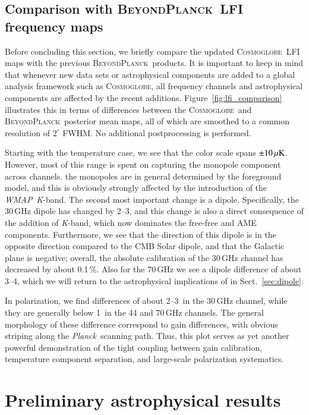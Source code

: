 \documentclass[twocolumn]{../../common/aa}
\def\WMAP{\emph{WMAP}}
\def\Planck{\emph{Planck}}
\newcommand{\BP}{\textsc{BeyondPlanck}}
\newcommand{\bp}{\textsc{BeyondPlanck}}
\newcommand{\cosmoglobe}{\textsc{Cosmoglobe}}
\newcommand{\K}[0]{\textit K}
\begin{document}
\subsection{Comparison with \BP\ LFI frequency maps}
\label{subsec:lfi_comparison}

Before concluding this section, we briefly compare the updated \cosmoglobe\ LFI maps with the previous \bp\ products. It is important to keep in mind that whenever new data sets or astrophysical components are added to a global analysis framework such as \cosmoglobe, all frequency channels and astrophysical components are affected by the recent additions. Figure~\ref{fig:lfi_comparison} illustrates this in terms of differences between the \cosmoglobe\ and \bp\ posterior mean maps, all of which are smoothed to a common resolution of $2^{\circ}$ FWHM. No additional postprocessing is performed.

Starting with the temperature case, we see that the color scale spans
$\pm10\muK$. However, most of this range is spent on capturing the monopole
component across channels. the monopoles are in general determined by the
foreground model, and this is obviously strongly affected by the introduction of
the \WMAP\ \K-band. The second most important change is a dipole. Specifically,
the 30\,GHz dipole has changed by 2--3\muK, and this change is also a direct consequence of the addition of \K-band, which now dominates the free-free and AME components. Furthermore, we see that the direction of this dipole is in the opposite direction compared to the CMB Solar dipole, and that the Galactic plane is negative; overall, the absolute calibration of the 30\,GHz channel has decreased by about 0.1\,\%. Also for the 70\,GHz we see a dipole difference of about 3--4\muK, which we will return to the astrophysical implications of in Sect.~\ref{sec:dipole}.

In polarization, we find differences of about 2--3\muK\ in the 30\,GHz channel, while they are generally below 1\muK\ in the 44 and 70\,GHz channels. The general morphology of these difference correspond to gain differences, with obvious striping along the \Planck\ scanning path. Thus, this plot serves as yet another powerful demonstration of the tight coupling between gain calibration, temperature component separation, and large-scale polarization systematics. 


\section{Preliminary astrophysical results}
\label{sec:astrophysics}
\end{document}
